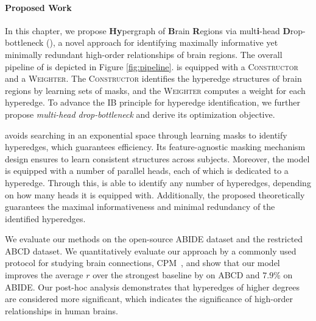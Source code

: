\paragraph{Proposed Work} In this chapter, we propose \textbf{Hy}pergraph of \textbf{B}rain \textbf{R}egions via mult\textbf{i}-head \textbf{D}rop-bottleneck (\hybrid{}), a novel approach for identifying maximally informative yet minimally redundant high-order relationships of brain regions. The overall pipeline of \hybrid{} is depicted in Figure \ref{fig:pipeline}. \hybrid{} is equipped with a \textsc{Constructor} and a \textsc{Weighter}. The \textsc{Constructor} identifies the hyperedge structures of brain regions by learning sets of masks, and the \textsc{Weighter} computes a weight for each hyperedge. To advance the IB principle for hyperedge identification, we further propose \textit{multi-head drop-bottleneck} and derive its optimization objective.

\hybrid{} avoids searching in an exponential space through learning masks to identify hyperedges, which guarantees efficiency. Its feature-agnostic masking mechanism design ensures \hybrid{} to learn consistent structures across subjects. Moreover, the model is equipped with a number of parallel heads, each of which is dedicated to a hyperedge. Through this, \hybrid{} is able to identify any number of hyperedges, depending on how many heads it is equipped with. Additionally, the proposed \multiheadname{} theoretically guarantees the maximal informativeness and minimal redundancy of the identified hyperedges. 


We evaluate our methods on the open-source ABIDE dataset and the restricted ABCD dataset. We quantitatively evaluate our approach by a commonly used protocol for studying brain connections, CPM~\citep{shen2017using}, and show that our model improves the average $r$ over the strongest baseline by \avgimp{} on ABCD and $7.9\%$ on ABIDE. Our post-hoc analysis demonstrates that hyperedges of higher degrees are considered more significant, which indicates the significance of high-order relationships in human brains.